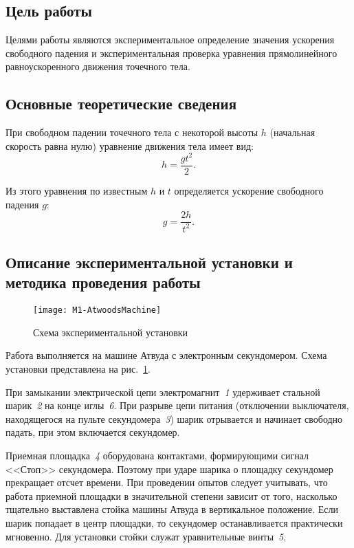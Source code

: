 \documentclass[a4paper, 12pt]{extarticle}
\begin{document}
\MTDTitlePage
\MTDInfoPage

\setcounter{section}{1}

\subsection{Цель работы}
Целями работы являются экспериментальное определение значения ускорения свободного падения и экспериментальная проверка уравнения прямолинейного равноускоренного движения точечного тела.

\subsection{Основные теоретические сведения}
При свободном падении точечного тела с некоторой высоты $h$ (начальная скорость равна нулю) уравнение движения тела имеет вид: %
\begin{equation}
\label{eq:m1-free-fall-h}
h = \frac{gt^2}{2}.
\end{equation}

Из этого уравнения по известным $h$ и $t$ определяется ускорение свободного падения $g$: %
\begin{equation}
\label{eq:m1-free-fall-g}
g = \frac{2h}{t^2}.
\end{equation}

\subsection{Описание экспериментальной установки и методика проведения работы}
\begin{figure}[h] %
\begin{center}
\texttt{[image: M1-AtwoodsMachine]}
\caption{Схема экспериментальной установки \label{fig:m1-atwood-machine}}
\end{center}
\end{figure}
Работа выполняется на машине Атвуда с электронным секундомером. Схема установки представлена на рис.~\ref{fig:m1-atwood-machine}.

При замыкании электрической цепи электромагнит~\emph{1} удерживает стальной шарик~\emph{2} на конце иглы~\emph{6}. При разрыве цепи питания (отключении выключателя, находящегося на пульте секундомера~\emph{3}) шарик отрывается и начинает свободно падать, при этом включается секундомер. %

Приемная площадка~\emph{4} оборудована контактами, формирующими сигнал <<Стоп>> секундомера. Поэтому при ударе шарика о площадку секундомер прекращает отсчет времени. При проведении опытов следует учитывать, что работа приемной площадки в значительной степени зависит от того, насколько тщательно выставлена стойка машины Атвуда в вертикальное положение. Если шарик попадает в центр площадки, то секундомер останавливается практически мгновенно. Для установки стойки служат уравнительные винты~\emph{5}. %
\end{document}

